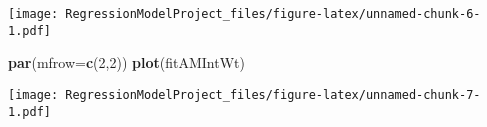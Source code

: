 \documentclass[]{article}
\newenvironment{Shaded}{\begin{snugshade}}{\end{snugshade}}
\newcommand{\KeywordTok}[1]{\textcolor[rgb]{0.13,0.29,0.53}{\textbf{{#1}}}}
\newcommand{\DataTypeTok}[1]{\textcolor[rgb]{0.13,0.29,0.53}{{#1}}}
\newcommand{\DecValTok}[1]{\textcolor[rgb]{0.00,0.00,0.81}{{#1}}}
\newcommand{\NormalTok}[1]{{#1}}
\begin{document}
\texttt{[image: RegressionModelProject\_files/figure-latex/unnamed-chunk-6-1.pdf]}

\begin{Shaded}
\begin{Highlighting}[]
\KeywordTok{par}\NormalTok{(}\DataTypeTok{mfrow=}\KeywordTok{c}\NormalTok{(}\DecValTok{2}\NormalTok{,}\DecValTok{2}\NormalTok{))}
\KeywordTok{plot}\NormalTok{(fitAMIntWt)}
\end{Highlighting}
\end{Shaded}

\texttt{[image: RegressionModelProject\_files/figure-latex/unnamed-chunk-7-1.pdf]}
\end{document}
